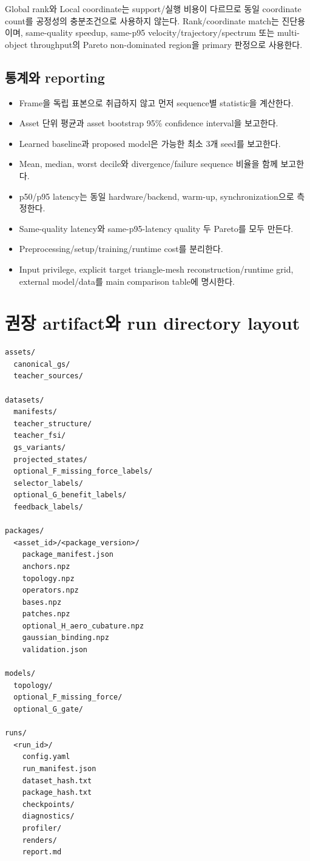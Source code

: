 \documentclass[10pt,a4paper]{article}
\newcommand{\todo}{\textcolor{TodoGray}{\(\square\)}}
\begin{document}
Global rank와 Local coordinate는 support/실행 비용이 다르므로 동일 coordinate count를
공정성의 충분조건으로 사용하지 않는다. Rank/coordinate match는 진단용이며,
same-quality speedup, same-p95 velocity/trajectory/spectrum 또는 multi-object throughput의
Pareto non-dominated region을 primary 판정으로 사용한다.

\subsection{통계와 reporting}

\begin{itemize}
  \item[\todo] Frame을 독립 표본으로 취급하지 않고 먼저 sequence별 statistic을 계산한다.
  \item[\todo] Asset 단위 평균과 asset bootstrap 95\% confidence interval을 보고한다.
  \item[\todo] Learned baseline과 proposed model은 가능한 최소 3개 seed를 보고한다.
  \item[\todo] Mean, median, worst decile와 divergence/failure sequence 비율을 함께 보고한다.
  \item[\todo] p50/p95 latency는 동일 hardware/backend, warm-up, synchronization으로 측정한다.
  \item[\todo] Same-quality latency와 same-p95-latency quality 두 Pareto를 모두 만든다.
  \item[\todo] Preprocessing/setup/training/runtime cost를 분리한다.
  \item[\todo] Input privilege, explicit target triangle-mesh reconstruction/runtime grid, external model/data를 main comparison table에 명시한다.
\end{itemize}

\section{권장 artifact와 run directory layout}

\begin{lstlisting}
assets/
  canonical_gs/
  teacher_sources/

datasets/
  manifests/
  teacher_structure/
  teacher_fsi/
  gs_variants/
  projected_states/
  optional_F_missing_force_labels/
  selector_labels/
  optional_G_benefit_labels/
  feedback_labels/

packages/
  <asset_id>/<package_version>/
    package_manifest.json
    anchors.npz
    topology.npz
    operators.npz
    bases.npz
    patches.npz
    optional_H_aero_cubature.npz
    gaussian_binding.npz
    validation.json

models/
  topology/
  optional_F_missing_force/
  optional_G_gate/

runs/
  <run_id>/
    config.yaml
    run_manifest.json
    dataset_hash.txt
    package_hash.txt
    checkpoints/
    diagnostics/
    profiler/
    renders/
    report.md
\end{lstlisting}
\end{document}
